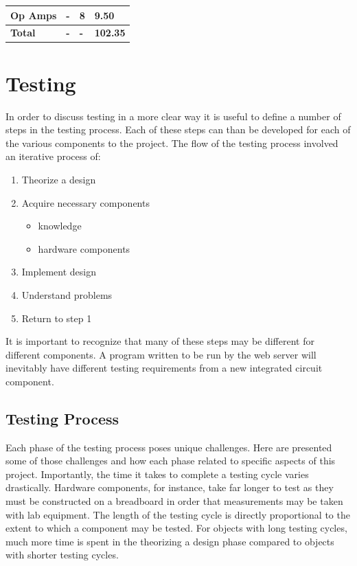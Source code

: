 \documentclass{article}	%
\begin{document}
\begin{multicols}{2}
\begin{center}
\begin{tabularx}{0.4\textwidth}{|X|X|X|X|}
        \textbf{Op Amps} &
        \textbf{-} &
        \textbf{8} &
        \textbf{9.50} \\
        \hline

        \textbf{Total} &
        \textbf{-} &
        \textbf{-} &
        \textbf{102.35} \\

        \hline
    \end{tabularx}
\end{center}

\section{Testing}
In order to discuss testing in a more clear way
it is useful to define a number of steps
in the testing process.
Each of these steps can than be developed for
each of the various components to the project.
%
The flow of the testing process
involved an iterative process of:
\begin{enumerate}
\item Theorize a design
\item Acquire necessary components
    \begin{itemize}
    \item knowledge
    \item hardware components
    \end{itemize}
\item Implement design
\item Understand problems
\item Return to step 1
\end{enumerate}
%
It is important to recognize that many
of these steps may be different for different components.
A program written to be run by the web server
will inevitably have different testing requirements from
a new integrated circuit component.

\subsection{Testing Process}
Each phase of the testing process poses unique challenges.
Here are presented some of those challenges and
how each phase related to specific aspects of this project.
Importantly, the time it takes to complete a 
testing cycle varies drastically.
Hardware components, for instance, take far longer to test
as they must be constructed on a breadboard in order that 
measurements may be taken with lab equipment.
%
The length of the testing cycle is 
directly proportional to the extent to
which a component may be tested.
%
For objects with long testing cycles,
much more time is spent in the 
theorizing a design phase compared to
objects with shorter testing cycles.


\end{multicols}
\end{document}
